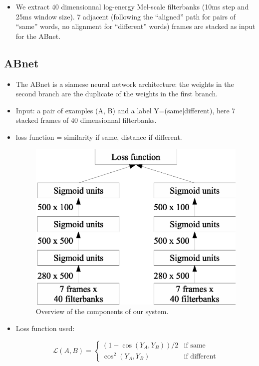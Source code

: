 \documentclass[final]{beamer}
\newcommand{\abnet}{{\sc ABnet}}
\begin{document}
\begin{frame}[t]
\begin{multicols}{3}
\begin{itemize}
\item We extract 40 dimensionnal log-energy Mel-scale filterbanks (10ms step and 25ms window size). 7 adjacent (following the ``aligned'' path for pairs of ``same'' words, no alignment for ``different'' words) frames are stacked as input for the \abnet{}.
\end{itemize}

\subsection{ABnet}

\begin{itemize}
\item The \abnet{} is a siamese neural network architecture: the weights in the second branch are the duplicate of the weights in the first branch.
\item Input: a pair of examples (A, B) and a label Y=(same|different), here 7 stacked frames of 40 dimensionnal filterbanks.
\item loss function = similarity if same, distance if different.

\vspace{1cm}
\begin{figure}[ht!]
  \begin{center}
    \includegraphics[width=0.85\columnwidth]{abnet}
    \caption{\label{fig:system}Overview of the components of our system.}
  \end{center}
\end{figure}

\item Loss function used:

\[
\mathcal{L}(A, B) =
\begin{cases}
(1-\cos(Y_A, Y_B)) / 2 & \text{if same} \\
\cos^2(Y_A, Y_B)       & \text{if different}
\end{cases}
\]


\end{itemize}
\end{multicols}
\end{frame}
\end{document}
